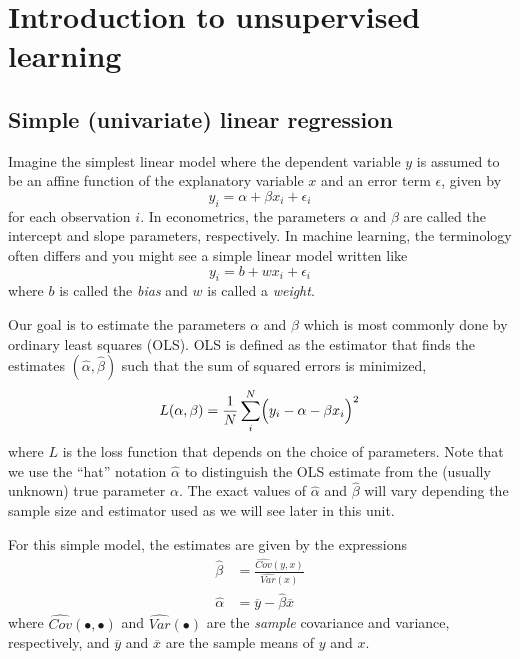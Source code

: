\documentclass{scrartcl}
\begin{document}
    
    \maketitle
    \tableofcontents
    
    

    
    \hypertarget{introduction-to-unsupervised-learning}{%
\section{Introduction to unsupervised
learning}\label{introduction-to-unsupervised-learning}}

    \hypertarget{simple-univariate-linear-regression}{%
\subsection{Simple (univariate) linear
regression}\label{simple-univariate-linear-regression}}

Imagine the simplest linear model where the dependent variable \(y\) is
assumed to be an affine function of the explanatory variable \(x\) and
an error term \(\epsilon\), given by \[
y_i = \alpha + \beta x_i + \epsilon_i
\] for each observation \(i\). In econometrics, the parameters
\(\alpha\) and \(\beta\) are called the intercept and slope parameters,
respectively. In machine learning, the terminology often differs and you
might see a simple linear model written like \[
y_i = b + w x_i + \epsilon_i
\] where \(b\) is called the \emph{bias} and \(w\) is called a
\emph{weight}.

Our goal is to estimate the parameters \(\alpha\) and \(\beta\) which is
most commonly done by ordinary least squares (OLS). OLS is defined as
the estimator that finds the estimates
\((\widehat{\alpha}, \widehat{\beta})\) such that the sum of squared
errors is minimized, \[
L(\alpha, \beta) = \frac{1}{N}
    \sum_i^N \Bigl(y_i - \alpha - \beta x_i \Bigr)^2
\] where \(L\) is the loss function that depends on the choice of
parameters. Note that we use the ``hat'' notation \(\widehat{\alpha}\)
to distinguish the OLS estimate from the (usually unknown) true
parameter \(\alpha\). The exact values of \(\widehat{\alpha}\) and
\(\widehat{\beta}\) will vary depending the sample size and estimator
used as we will see later in this unit.

For this simple model, the estimates are given by the expressions \[
\begin{aligned}
\widehat{\beta} &= \frac{\widehat{Cov}(y,x)}{\widehat{Var}(x)} \\
\widehat{\alpha} &= \overline{y} - \widehat{\beta} \overline{x}
\end{aligned}
\] where \(\widehat{Cov}(\bullet,\bullet)\) and
\(\widehat{Var}(\bullet)\) are the \emph{sample} covariance and
variance, respectively, and \(\overline{y}\) and \(\overline{x}\) are
the sample means of \(y\) and \(x\).
\end{document}

